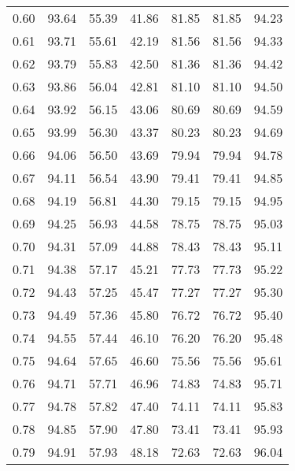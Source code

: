 \begin{tabular}{|c|c|c|c|c|c|c|}
      0.60 &     93.64 &     55.39 &      41.86 &   81.85 &      81.85 &         94.23 \\
      0.61 &     93.71 &     55.61 &      42.19 &   81.56 &      81.56 &         94.33 \\
      0.62 &     93.79 &     55.83 &      42.50 &   81.36 &      81.36 &         94.42 \\
      0.63 &     93.86 &     56.04 &      42.81 &   81.10 &      81.10 &         94.50 \\
      0.64 &     93.92 &     56.15 &      43.06 &   80.69 &      80.69 &         94.59 \\
      0.65 &     93.99 &     56.30 &      43.37 &   80.23 &      80.23 &         94.69 \\
      0.66 &     94.06 &     56.50 &      43.69 &   79.94 &      79.94 &         94.78 \\
      0.67 &     94.11 &     56.54 &      43.90 &   79.41 &      79.41 &         94.85 \\
      0.68 &     94.19 &     56.81 &      44.30 &   79.15 &      79.15 &         94.95 \\
      0.69 &     94.25 &     56.93 &      44.58 &   78.75 &      78.75 &         95.03 \\
      0.70 &     94.31 &     57.09 &      44.88 &   78.43 &      78.43 &         95.11 \\
      0.71 &     94.38 &     57.17 &      45.21 &   77.73 &      77.73 &         95.22 \\
      0.72 &     94.43 &     57.25 &      45.47 &   77.27 &      77.27 &         95.30 \\
      0.73 &     94.49 &     57.36 &      45.80 &   76.72 &      76.72 &         95.40 \\
      0.74 &     94.55 &     57.44 &      46.10 &   76.20 &      76.20 &         95.48 \\
      0.75 &     94.64 &     57.65 &      46.60 &   75.56 &      75.56 &         95.61 \\
      0.76 &     94.71 &     57.71 &      46.96 &   74.83 &      74.83 &         95.71 \\
      0.77 &     94.78 &     57.82 &      47.40 &   74.11 &      74.11 &         95.83 \\
      0.78 &     94.85 &     57.90 &      47.80 &   73.41 &      73.41 &         95.93 \\
      0.79 &     94.91 &     57.93 &      48.18 &   72.63 &      72.63 &         96.04 \\

\end{tabular}
